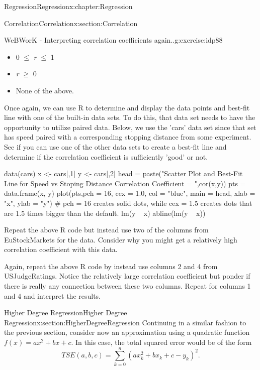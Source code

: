 \documentclass[oneside,10pt,]{book}
\numberwithin{equation}{section}
\begin{document}
\begin{chapterptx}{Regression}{}{Regression}{}{}{x:chapter:Regression}
\begin{sectionptx}{Correlation}{}{Correlation}{}{}{x:section:Correlation}
\begin{inlineexercise}{WeBWorK - Interpreting correlation coefficients again..}{g:exercise:idp88}
\begin{itemize}[label=$\odot$,leftmargin=3em,]
\item{}0 \(\le\) \emph{r} \(\le\) 1%

\item{}\emph{r} \(\ge\) 0%

\item{}None of the above.%

\end{itemize}
%
\end{inlineexercise}%
Once again, we can use R to determine and display the data points and best-fit line with one of the built-in data sets. To do this, that data set needs to have the opportunity to utilize paired data. Below, we use the 'cars' data set since that set has speed paired with a corresponding stopping distance from some experiment. See if you can use one of the other data sets to create a best-fit line and determine if the correlation coefficient is sufficiently 'good' or not.%
\begin{sageinput}
data(cars)
x <- cars[,1]
y <- cars[,2]
head = paste("Scatter Plot and Best-Fit Line for \n Speed vs Stoping Distance \n Correlation Coefficient = ",cor(x,y))   
pts = data.frame(x, y)
plot(pts,pch = 16, cex = 1.0, col = "blue", main = head, xlab = "x", ylab = "y")
# pch = 16 creates solid dots, while cex = 1.5 creates dots that are 1.5 times bigger than the default.
lm(y ~ x)
abline(lm(y ~ x))
\end{sageinput}
Repeat the above R code but instead use two of the columns from EuStockMarkets for the data. Consider why you might get a relatively high correlation coefficient with this data.%
\par
Again, repeat the above R code by instead use columns 2 and 4 from USJudgeRatings. Notice the relatively large correlation coefficient but ponder if there is really any connection between these two columns. Repeat for columns 1 and 4 and interpret the results.%
\end{sectionptx}
%
%
\typeout{************************************************}
\typeout{************************************************}
%
\begin{sectionptx}{Higher Degree Regression}{}{Higher Degree Regression}{}{}{x:section:HigherDegreeRegression}
Continuing in a similar fashion to the previous section, consider now an approximation using a quadratic function \(f(x) = ax^2 + bx + c\).  In this case, the total squared error would be of the form%
\begin{equation*}
TSE(a,b,c) = \sum_{k=0}^n (a x_k^2 + b x_k + c - y_k)^2.

\end{equation*}
\end{sectionptx}
\end{chapterptx}
\end{document}
